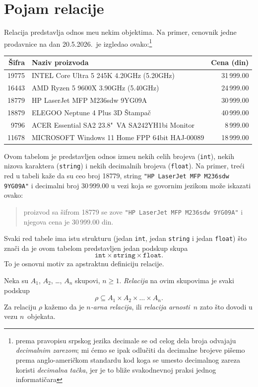 \section{Pojam relacije}

Relacija predstavlja odnos me\dj u nekim objektima. Na primer,
cenovnik jedne prodavnice na dan 20.5.2026.\ je izgledao ovako:\footnote{prema pravopisu srpskog jezika
decimale se od celog dela broja odvajaju \emph{decimalnim zarezom}; mi \'cemo se ipak odlu\v citi
da decimalne brojeve pi\v semo prema anglo-ameri\v ckom standardu kod koga se umesto decimalnog zareza
koristi \emph{decimalna ta\v cka}, jer je to bli\v ze svakodnevnoj praksi jednog informati\v cara}
\begin{center}\label{ft07.page.tabela}
  \begin{tabular}{rlr}
  \hline
  \v Sifra & Naziv proizvoda & Cena (din) \\
  \hline
  19775 & INTEL Core Ultra 5 245K 4.20GHz (5.20GHz) & 31\,999.00\\
  16443 & AMD Ryzen 5 9600X 3.90GHz (5.40GHz) & 24\,999.00\\
  18779 & HP LaserJet MFP M236sdw 9YG09A & 30\,999.00\\
  18879 & ELEGOO Neptune 4 Plus 3D \v Stampa\v c & 40\,999.00\\
   9796 & ACER Essential SA2 23.8"\ VA SA242YH1bi Monitor & 8\,999.00\\
  11678 & MICROSOFT Windows 11 Home FPP 64bit HAJ-00089 & 18\,999.00
  \end{tabular}
\end{center}
Ovom tabelom je predstavljen odnos izme\dj u nekih celih brojeva (\texttt{int}), nekih nizova karaktera (\texttt{string})
i nekih decimalnih brojeva (\texttt{float}). Na primer, tre\'ci red u tabeli ka\v ze da su ceo broj
18779, string \verb`"HP LaserJet MFP M236sdw 9YG09A"` i decimalni broj 30\,999.00 u vezi koja se govornim jezikom mo\v ze iskazati ovako:
\begin{quote}
  proizvod sa \v sifrom 18779 se zove \verb`"HP LaserJet MFP M236sdw 9YG09A"` i njegova cena je 30\,999.00 din.
\end{quote}
Svaki red tabele ima istu strukturu (jedan \texttt{int}, jedan \texttt{string} i jedan \texttt{float}) \v sto zna\v ci da je ovom
tabelom predstavljen jedan podskup skupa
$$
  \mathtt{int} \times \mathtt{string} \times \mathtt{float}.
$$
To je osnovni motiv za apstraktnu definiciju relacije.

\begin{DEF}\label{ds1.def.rel-0}
  Neka su $A_1$, $A_2$, \ldots, $A_n$ skupovi, $n \ge 1$. \emph{Relacija} na ovim skupovima je svaki podskup
  $$
    \rho \subseteq A_1 \times A_2 \times \ldots \times A_n.
  $$
  Za relaciju $\rho$ ka\v zemo da je \emph{$n$-arna relacija}, ili \emph{relacija arnosti~$n$}
  zato \v sto dovodi u vezu $n$~objekata.
\end{DEF}

